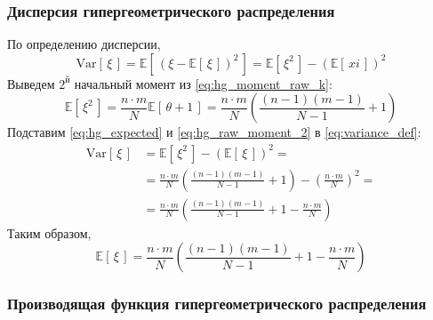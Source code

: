 \documentclass[
  russian,
  a4paper,
  russian]{scrreprt}
\begin{document}
\hypertarget{ux434ux438ux441ux43fux435ux440ux441ux438ux44f-ux433ux438ux43fux435ux440ux433ux435ux43eux43cux435ux442ux440ux438ux447ux435ux441ux43aux43eux433ux43e-ux440ux430ux441ux43fux440ux435ux434ux435ux43bux435ux43dux438ux44f}{%
\subsubsection{Дисперсия гипергеометрического
распределения}\label{ux434ux438ux441ux43fux435ux440ux441ux438ux44f-ux433ux438ux43fux435ux440ux433ux435ux43eux43cux435ux442ux440ux438ux447ux435ux441ux43aux43eux433ux43e-ux440ux430ux441ux43fux440ux435ux434ux435ux43bux435ux43dux438ux44f}}

По определению дисперсии,
\begin{equation}\mathrm{Var}\left[\, \xi \,\right] = \mathbb{E}\left[\, \left(\xi - \mathbb{E}\left[\, \xi \,\right]\right)^2 \,\right] = \mathbb{E}\left[\, \xi^2 \,\right] - \left(\mathbb{E}\left[\, xi \,\right]\right)^2\label{eq:variance_def}\end{equation}
Выведем \(2^\text{й}\) начальный момент из \ref{eq:hg_moment_raw_k}:
\begin{equation}\mathbb{E}\left[\, \xi^2 \,\right]
= \frac{n \cdot m}{N}\mathbb{E}\left[\, \theta+1 \,\right]
= \frac{n \cdot m}{N}\left(\frac{(n-1)(m-1)}{N-1}+1\right)\label{eq:hg_raw_moment_2}\end{equation}
Подставим \ref{eq:hg_expected} и \ref{eq:hg_raw_moment_2} в
\ref{eq:variance_def}: \[\begin{aligned}
    \mathrm{Var}\left[\, \xi \,\right] &= \mathbb{E}\left[\, \xi^2 \,\right] - \left(\mathbb{E}\left[\, \xi \,\right]\right)^2 =\\
              &= \frac{n \cdot m}{N}\left(\frac{(n-1)(m-1)}{N-1}+1\right)
                    - \left(\frac{n \cdot m}{N}\right)^2=\\
              &= \frac{n \cdot m}{N}\left(\frac{(n-1)(m-1)}{N-1} + 1
                   - \frac{n \cdot m}{N}\right)
\end{aligned}\] Таким образом, \[\boxed{
    \mathbb{E}\left[\, \xi \,\right] = \frac{n \cdot m}{N}\left(\frac{(n-1)(m-1)}{N-1} + 1 - \frac{n \cdot m}{N}\right)
}\]

\hypertarget{ux43fux440ux43eux438ux437ux432ux43eux434ux44fux449ux430ux44f-ux444ux443ux43dux43aux446ux438ux44f-ux433ux438ux43fux435ux440ux433ux435ux43eux43cux435ux442ux440ux438ux447ux435ux441ux43aux43eux433ux43e-ux440ux430ux441ux43fux440ux435ux434ux435ux43bux435ux43dux438ux44f}{%
\subsubsection{Производящая функция гипергеометрического
распределения}\label{ux43fux440ux43eux438ux437ux432ux43eux434ux44fux449ux430ux44f-ux444ux443ux43dux43aux446ux438ux44f-ux433ux438ux43fux435ux440ux433ux435ux43eux43cux435ux442ux440ux438ux447ux435ux441ux43aux43eux433ux43e-ux440ux430ux441ux43fux440ux435ux434ux435ux43bux435ux43dux438ux44f}}
\end{document}
